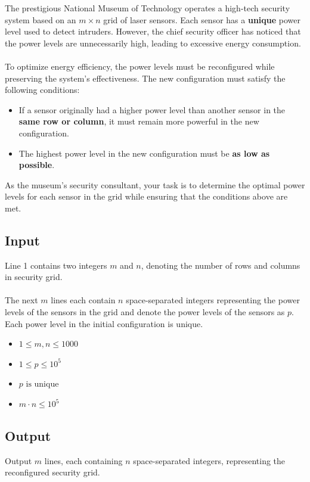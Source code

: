 \documentclass[12pt,a4paper]{article}
\begin{document}
\noindent
The prestigious National Museum of Technology operates a high-tech security system based on an \(m \times n\) grid of laser sensors. Each sensor has a \textbf{unique} power level used to detect intruders. However, the chief security officer has noticed that the power levels are unnecessarily high, leading to excessive energy consumption.
\\\\
\noindent
To optimize energy efficiency, the power levels must be reconfigured while preserving the system's effectiveness. The new configuration must satisfy the following conditions:
\begin{itemize}
    \item If a sensor originally had a higher power level than another sensor in the \textbf{same row or column}, it must remain more powerful in the new configuration.
    \item The highest power level in the new configuration must be \textbf{as low as possible}.
\end{itemize}

\noindent
As the museum's security consultant, your task is to determine the optimal power levels for each sensor in the grid while ensuring that the conditions above are met.

\subsection*{\fontsize{16}{12}Input}
Line 1 contains two integers \(m\) and \(n\), denoting the number of rows and columns in security grid.
\\\\
\noindent
The next \(m\) lines each contain \(n\) space-separated integers representing the power levels of the sensors in the grid and denote the power levels of the sensors as $p$. Each power level in the initial configuration is unique.
\begin{itemize}
    \item \(1 \leq m, n \leq 1000\)
    \item $1\leq p \leq 10^5$
    \item $p \text{ is unique}$
    \item \(m \cdot n \leq 10^5\)
\end{itemize}
\subsection*{\fontsize{16}{12}Output}
Output \(m\) lines, each containing \(n\) space-separated integers, representing the reconfigured security grid.
\end{document}
